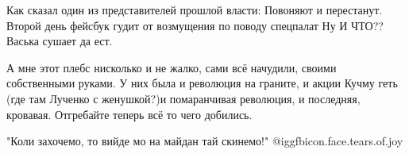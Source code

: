 \begin{itemize}

Как сказал один из представителей прошлой власти: Повоняют и перестанут. Второй
день фейсбук гудит от возмущения по поводу спецпалат Ну И ЧТО?? Васька сушает
да ест.


А мне этот плебс нисколько и не жалко, сами всё начудили, своими собственными
руками. У них была и революция на граните, и акции Кучму геть (где там Лученко с
женушкой?)и помаранчивая революция, и последняя, кровавая. Отгребайте теперь всё
то чего добились.



"Коли захочемо, то вийде
мо на майдан тай скинемо!"  @igg{fbicon.face.tears.of.joy} 

\end{itemize} %
